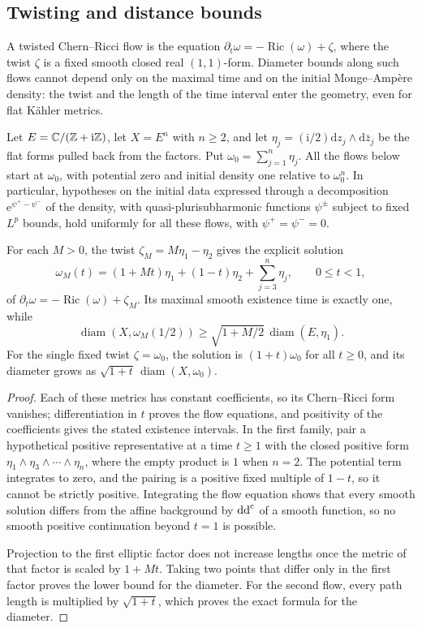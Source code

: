 \subsection{Twisting and distance bounds}
\label{sec:twisted-flow-distance-dependence}

A twisted Chern--Ricci flow is the equation $\partial_t\omega=-\operatorname{Ric}(\omega)+\zeta$, where the twist $\zeta$ is a fixed smooth closed real $(1,1)$-form. Diameter bounds along such flows cannot depend only on the maximal time and on the initial Monge--Amp\`ere density: the twist and the length of the time interval enter the geometry, even for flat K\"ahler metrics.

\begin{example}\label{ex:twisted-flow-distance-dependence}
Let $E=\mathbb C/(\mathbb Z+\mathrm i\mathbb Z)$, let $X=E^n$ with $n\geq2$, and let $\eta_j=(\mathrm i/2)\mathrm dz_j\wedge\mathrm d\bar z_j$ be the flat forms pulled back from the factors. Put $\omega_0=\sum_{j=1}^n\eta_j$. All the flows below start at $\omega_0$, with potential zero and initial density one relative to $\omega_0^n$. In particular, hypotheses on the initial data expressed through a decomposition $\mathrm e^{\psi^+-\psi^-}$ of the density, with quasi-plurisubharmonic functions $\psi^\pm$ subject to fixed $L^p$ bounds, hold uniformly for all these flows, with $\psi^+=\psi^-=0$.

For each $M>0$, the twist $\zeta_M=M\eta_1-\eta_2$ gives the explicit solution
\[
 \omega_M(t)=(1+Mt)\eta_1+(1-t)\eta_2+
                         \sum_{j=3}^n\eta_j,
 \qquad 0\leq t<1,
\]
of $\partial_t\omega=-\operatorname{Ric}(\omega)+\zeta_M$. Its maximal smooth existence time is exactly one, while
\[
 \operatorname{diam}(X,\omega_M(1/2))
 \geq \sqrt{1+M/2}\,\operatorname{diam}(E,\eta_1).
\]
For the single fixed twist $\zeta=\omega_0$, the solution is $(1+t)\omega_0$ for all $t\geq0$, and its diameter grows as $\sqrt{1+t}\,\operatorname{diam}(X,\omega_0)$.
\end{example}
\begin{proof}
Each of these metrics has constant coefficients, so its Chern--Ricci form vanishes; differentiation in $t$ proves the flow equations, and positivity of the coefficients gives the stated existence intervals. In the first family, pair a hypothetical positive representative at a time $t\geq1$ with the closed positive form $\eta_1\wedge\eta_3\wedge\cdots\wedge\eta_n$, where the empty product is $1$ when $n=2$. The potential term integrates to zero, and the pairing is a positive fixed multiple of $1-t$, so it cannot be strictly positive. Integrating the flow equation shows that every smooth solution differs from the affine background by $\mathrm{dd}^{\mathrm{c}}$ of a smooth function, so no smooth positive continuation beyond $t=1$ is possible.

Projection to the first elliptic factor does not increase lengths once the metric of that factor is scaled by $1+Mt$. Taking two points that differ only in the first factor proves the lower bound for the diameter. For the second flow, every path length is multiplied by $\sqrt{1+t}$, which proves the exact formula for the diameter.
\end{proof}

